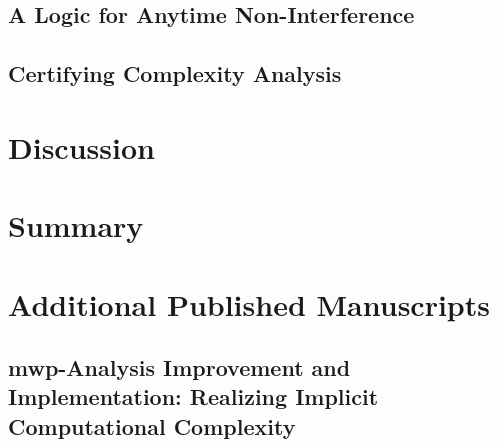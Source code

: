     \section{A Logic for Anytime Non-Interference}\label{sec:anytime}
    
    \clearpage

    \section{Certifying Complexity Analysis}\label{certcpx}
    
    \clearpage

\chapter{Discussion}\label{ch:discussion}


\chapter{Summary}\label{ch:summary}


\backmatter
\printbibliography[label=chap:references, title=References]
\let\printbibliography\relax

\appendix

\chapter{Additional Published Manuscripts}\label{additional-manuscripts}
\clearpage

    \section{mwp-Analysis Improvement and Implementation: Realizing Implicit
    Computational Complexity}\label{sec:fscd}
    
    \clearpage

